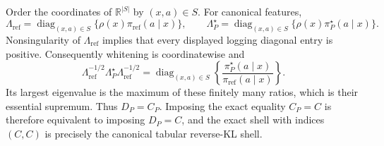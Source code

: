 Order the coordinates of \(\mathbb R^{|S|}\) by \((x,a)\in S\). For canonical features,
\[
\Lambda_{\mathrm{ref}}=\operatorname{diag}_{(x,a)\in S}\{\rho(x)\pi_{\mathrm{ref}}(a\mid x)\},
\qquad
\Lambda_P^\star=\operatorname{diag}_{(x,a)\in S}\{\rho(x)\pi_P^\star(a\mid x)\}.
\]
Nonsingularity of \(\Lambda_{\mathrm{ref}}\) implies that every displayed logging diagonal entry is positive. Consequently whitening is coordinatewise and
\[
\Lambda_{\mathrm{ref}}^{-1/2}\Lambda_P^\star\Lambda_{\mathrm{ref}}^{-1/2}
=\operatorname{diag}_{(x,a)\in S}\left\{\frac{\pi_P^\star(a\mid x)}{\pi_{\mathrm{ref}}(a\mid x)}\right\}.
\]
Its largest eigenvalue is the maximum of these finitely many ratios, which is their essential supremum. Thus \(D_P=C_P\). Imposing the exact equality \(C_P=C\) is therefore equivalent to imposing \(D_P=C\), and the exact shell with indices \((C,C)\) is precisely the canonical tabular reverse-KL shell.